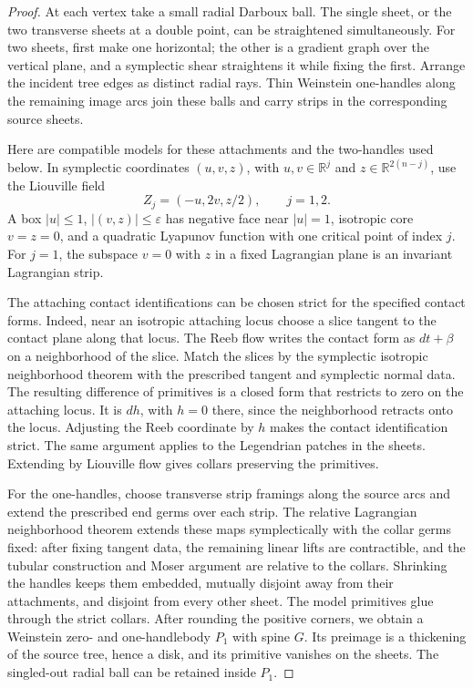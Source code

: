 \documentclass[11pt]{article}
\numberwithin{equation}{section}
\theoremstyle{definition}
\theoremstyle{remark}
\newcommand{\R}{\mathbb R}
\begin{document}
\begin{proof}
At each vertex take a small radial Darboux ball.  The single sheet,
or the two transverse sheets at a double point, can be straightened
simultaneously.  For two sheets, first make one horizontal; the other
is a gradient graph over the vertical plane, and a symplectic shear
straightens it while fixing the first.  Arrange the incident tree
edges as distinct radial rays.  Thin Weinstein one-handles along the
remaining image arcs join these balls and carry strips in the
corresponding source sheets.

Here are compatible models for these attachments and the two-handles
used below.  In symplectic coordinates $(u,v,z)$, with
$u,v\in\R^j$ and $z\in\R^{2(n-j)}$, use the Liouville field
\begin{equation}\label{topo:handle-field}
 Z_j=(-u,2v,z/2),\qquad j=1,2.
\end{equation}
A box $|u|\leq1$, $|(v,z)|\leq\varepsilon$ has negative face near
$|u|=1$, isotropic core $v=z=0$, and a quadratic Lyapunov function
with one critical point of index $j$.  For $j=1$, the subspace
$v=0$ with $z$ in a fixed Lagrangian plane is an invariant
Lagrangian strip.

The attaching contact identifications can be chosen strict for the
specified contact forms.  Indeed, near an isotropic attaching locus
choose a slice tangent to the contact plane along that locus.
The Reeb flow writes the contact form as $dt+\beta$ on a
neighborhood of the slice.  Match the slices by the symplectic
isotropic neighborhood theorem with the prescribed tangent and
symplectic normal data.  The resulting difference of primitives is
a closed form that restricts to zero on the attaching locus.
It is $dh$, with $h=0$ there, since the neighborhood retracts onto
the locus.  Adjusting the Reeb coordinate by $h$ makes the contact
identification strict.  The same argument applies to the Legendrian
patches in the sheets.  Extending by Liouville flow gives collars
preserving the primitives.

For the one-handles, choose transverse strip framings along the
source arcs and extend the prescribed end germs over each strip.
The relative Lagrangian neighborhood theorem extends these maps
symplectically with the collar germs fixed: after fixing tangent
data, the remaining linear lifts are contractible, and the tubular
construction and Moser argument are relative to the collars.
Shrinking the handles keeps them embedded, mutually disjoint away
from their attachments, and disjoint from every other sheet.
The model primitives glue through the strict collars.  After
rounding the positive corners, we obtain a Weinstein zero- and
one-handlebody $P_1$ with spine $G$.  Its preimage is a thickening
of the source tree, hence a disk, and its primitive vanishes on the
sheets.  The singled-out radial ball can be retained inside $P_1$.


\end{proof}
\end{document}
